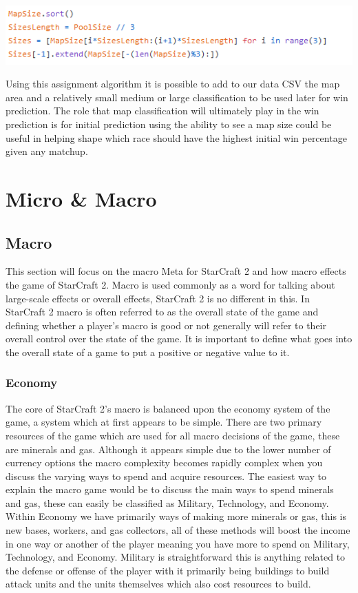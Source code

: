 \documentclass[a4paper,12pt]{report}
\begin{document}
\pagebreak
\begin{center}
    \captionsetup{type=figure}
    \includegraphics[width=.8\linewidth]{media/MapSorter.png}
\end{center}

Using this assignment algorithm it is possible to add to our data CSV the map area and a relatively small medium or large classification to be used later for win prediction. The role that map classification will ultimately play in the win prediction is for initial prediction using the ability to see a map size could be useful in helping shape which race should have the highest initial win percentage given any matchup.

\section{Micro \& Macro}
\subsection{Macro}

This section will focus on the macro Meta for StarCraft 2 and how macro effects the game of StarCraft 2. Macro is used commonly as a word for talking about large-scale effects or overall effects, StarCraft 2 is no different in this. In StarCraft 2 macro is often referred to as the overall state of the game and defining whether a player’s macro is good or not generally will refer to their overall control over the state of the game. It is important to define what goes into the overall state of a game to put a positive or negative value to it.

\subsubsection{Economy}

The core of StarCraft 2’s macro is balanced upon the economy system of the game, a system which at first appears to be simple. There are two primary resources of the game which are used for all macro decisions of the game, these are minerals and gas. Although it appears simple due to the lower number of currency options the macro complexity becomes rapidly complex when you discuss the varying ways to spend and acquire resources. The easiest way to explain the macro game would be to discuss the main ways to spend minerals and gas, these can easily be classified as Military, Technology, and Economy. Within Economy we have primarily ways of making more minerals or gas, this is new bases, workers, and gas collectors, all of these methods will boost the income in one way or another of the player meaning you have more to spend on Military, Technology, and Economy. Military is straightforward this is anything related to the defense or offense of the player with it primarily being buildings to build attack units and the units themselves which also cost resources to build.
\end{document}
